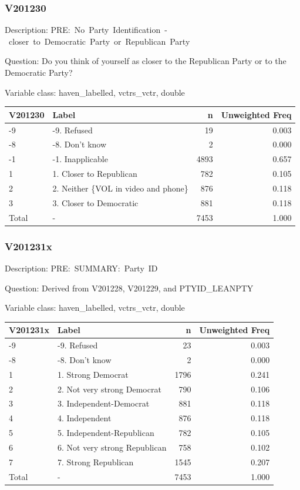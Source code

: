 \documentclass[
]{krantz}
\begin{document}
\hypertarget{v201230}{%
\subsubsection*{V201230}\label{v201230}}


Description: PRE:~No~Party~Identification~-~closer~to~Democratic~Party~or~Republican~Party

Question: Do you think of yourself as closer to the Republican Party or to the Democratic Party?

Variable class: haven\_labelled, vctrs\_vctr, double

\begin{tabular}[t]{l|l|r|r}
\hline
V201230 & Label & n & Unweighted Freq\\
\hline
-9 & -9. Refused & 19 & 0.003\\
\hline
-8 & -8. Don't know & 2 & 0.000\\
\hline
-1 & -1. Inapplicable & 4893 & 0.657\\
\hline
1 & 1. Closer to Republican & 782 & 0.105\\
\hline
2 & 2. Neither \{VOL in video and phone\} & 876 & 0.118\\
\hline
3 & 3. Closer to Democratic & 881 & 0.118\\
\hline
Total & - & 7453 & 1.000\\
\hline
\end{tabular}

\hypertarget{v201231x}{%
\subsubsection*{V201231x}\label{v201231x}}


Description: PRE:~SUMMARY:~Party~ID

Question: Derived from V201228, V201229, and PTYID\_LEANPTY

Variable class: haven\_labelled, vctrs\_vctr, double

\begin{tabular}[t]{l|l|r|r}
\hline
V201231x & Label & n & Unweighted Freq\\
\hline
-9 & -9. Refused & 23 & 0.003\\
\hline
-8 & -8. Don't know & 2 & 0.000\\
\hline
1 & 1. Strong Democrat & 1796 & 0.241\\
\hline
2 & 2. Not very strong Democrat & 790 & 0.106\\
\hline
3 & 3. Independent-Democrat & 881 & 0.118\\
\hline
4 & 4. Independent & 876 & 0.118\\
\hline
5 & 5. Independent-Republican & 782 & 0.105\\
\hline
6 & 6. Not very strong Republican & 758 & 0.102\\
\hline
7 & 7. Strong Republican & 1545 & 0.207\\
\hline
Total & - & 7453 & 1.000\\
\hline
\end{tabular}
\end{document}
